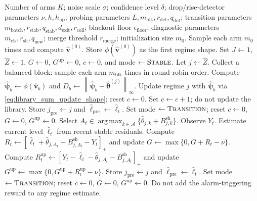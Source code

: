 \documentclass[11pt]{article}
\newcommand{\A}{\mathcal A}
\newcommand{\norm}[1]{\left\lVert #1 \right\rVert}
\newcommand{\pos}[1]{\left[#1\right]_{+}}
\DeclareMathOperator*{\argmax}{arg\,max}
\begin{document}
\begin{algorithm}[p]
\caption{Level-Invariant Transition-Aware Recurrent UCB (LI-TAR-UCB)}
\label{alg:li_tar_ucb}
\footnotesize
\begin{algorithmic}[1]
\Require Number of arms $K$; noise scale $\sigma$; confidence level $\delta$; drop/rise-detector parameters $\nu,h,h_{\mathrm{up}}$; probing parameters $L,m_{\mathrm{blk}},r_{\mathrm{det}},q_{\mathrm{det}}$; transition parameters $m_{\mathrm{batch}},r_{\mathrm{stab}},q_{\mathrm{stab}},d_{\mathrm{exit}},r_{\mathrm{coll}}$; blackout floor $\epsilon_{\mathrm{floor}}$; diagnostic parameters $m_{\mathrm{cls}},r_{\mathrm{sh}},q_{\mathrm{new}}$; merge threshold $r_{\mathrm{merge}}$; initialization size $m_0$.
\State Sample each arm $m_0$ times and compute $\widehat{\bm v}^{(0)}$.
\State Store $\phi(\widehat{\bm v}^{(0)})$ as the first regime shape.
\State Set $J\gets 1$, $\widehat Z\gets 1$, $G\gets 0$, $G^{\mathrm{up}}\gets 0$, $c\gets 0$, and mode $\gets\textsc{Stable}$.
        \State Let $j\gets\widehat Z$.
            \State Collect a balanced block: sample each arm $m_{\mathrm{blk}}$ times in round-robin order.
            \State Compute $\widehat{\bm\psi}_b\gets\phi(\widehat{\bm v}_b)$ and $D_b\gets\norm{\widehat{\bm\psi}_b-\widehat{\bm\theta}^{(j)}}_{\infty}$.
                \State Update regime $j$ with $\widehat{\bm\psi}_b$ via \eqref{eq:library_sum_update_shape}; reset $c\gets 0$.
            \Else
                \State Set $c\gets c+1$; do not update the library.
            \EndIf
                \State Store $j_{\mathrm{pre}}\gets j$ and $\widehat\ell_{\mathrm{pre}}\gets\widehat\ell_t$.
                \State Set mode $\gets\textsc{Transition}$; reset $c\gets0$, $G\gets0$, $G^{\mathrm{up}}\gets0$.
            \EndIf
        \Else
            \State Select $A_t\in\argmax_{k\in\A}\{\widehat\theta_{j,k}+B_{j,k}^{\mathrm{sh}}\}$.
            \State Observe $Y_t$.
            \State Estimate current level $\widehat\ell_t$ from recent stable residuals.
            \State Compute $R_t\gets\pos{\widehat\ell_t+\widehat\theta_{j,A_t}-B_{j,A_t}^{\mathrm{sh}}-Y_t}$ and update $G\gets\max\{0,G+R_t-\nu\}$.
            \State Compute $R_t^{\mathrm{up}}\gets\pos{Y_t-\widehat\ell_t-\widehat\theta_{j,A_t}-B_{j,A_t}^{\mathrm{sh}}}$ and update $G^{\mathrm{up}}\gets\max\{0,G^{\mathrm{up}}+R_t^{\mathrm{up}}-\nu\}$.
                \State Store $j_{\mathrm{pre}}\gets j$ and $\widehat\ell_{\mathrm{pre}}\gets\widehat\ell_t$.
                \State Set mode $\gets\textsc{Transition}$; reset $c\gets0$, $G\gets0$, $G^{\mathrm{up}}\gets0$.
                \State Do not add the alarm-triggering reward to any regime estimate.
            \EndIf
        \EndIf
\end{algorithmic}
\end{algorithm}
\end{document}
